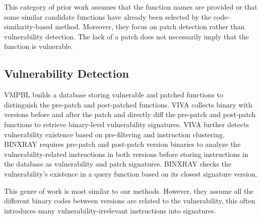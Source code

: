 This category of prior work assumes that the function names are provided or that some similar candidate functions have already been selected by the code-similarity-based method. 
Moreover, they focus on patch detection rather than vulnerability detection. 
The lack of a patch does not necessarily imply that the function is vulnerable.


\subsection{Vulnerability Detection}
VMPBL \cite{vmpbl} builds a database storing vulnerable and patched functions to distinguish the pre-patch and post-patched functions. 
VIVA \cite{viva} collects binary with versions before and after the patch and directly diff the pre-patch and post-patch functions to retrieve binary-level vulnerability signatures. 
VIVA further detects vulnerability existence based on pre-filtering and instruction clustering. 
BINXRAY \cite{binxray} requires pre-patch and post-patch version binaries to analyze the vulnerability-related instructions in both versions before storing instructions in the database as vulnerability and patch signatures. 
BINXRAY checks the vulnerability's existence in a query function based on its closest signature version.

This genre of work is most similar to our methods. 
However, they assume all the different binary codes between versions are related to the vulnerability, this often introduces many vulnerability-irrelevant instructions into signatures.